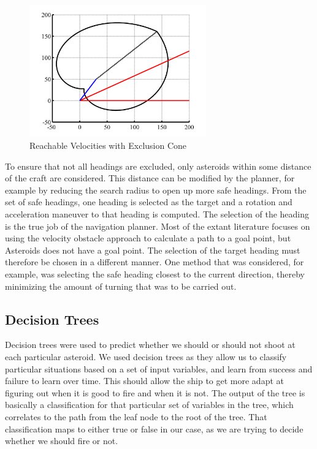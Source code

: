 \documentclass[10pt,final,conference]{article}
\begin{document}
\begin{figure}[ht]
\centering
\includegraphics[width=3in]{./deltav_curve_rotated_translated_obstacle_color.png}
\caption{Reachable Velocities with Exclusion Cone}
\label{fig:reachable_veloc}
\end{figure}

To ensure that not all headings are excluded, only asteroids within some distance of the craft are considered. This distance can be modified by the planner, for example by reducing the search radius to open up more safe headings. From the set of safe headings, one heading is selected as the target and a rotation and acceleration maneuver to that heading is computed. The selection of the heading is the true job of the navigation planner. Most of the extant literature focuses on using the velocity obstacle approach to calculate a path to a goal point, but Asteroids does not have a goal point. The selection of the target heading must therefore be chosen in a different manner. One method that was considered, for example, was selecting the safe heading closest to the current direction, thereby minimizing the amount of turning that was to be carried out.

\subsection{Decision Trees}
Decision trees were used to predict whether we should or should not shoot at each particular asteroid.  We used decision trees as they allow us to classify particular situations based on a set of input variables, and learn from success and failure to learn over time.  This should allow the ship to get more adapt at figuring out when it is good to fire and when it is not.  The output of the tree is basically a classification for that particular set of variables in the tree, which correlates to the path from the leaf node to the root of the tree.  That classification maps to either true or false in our case, as we are trying to decide whether we should fire or not.
\end{document}
